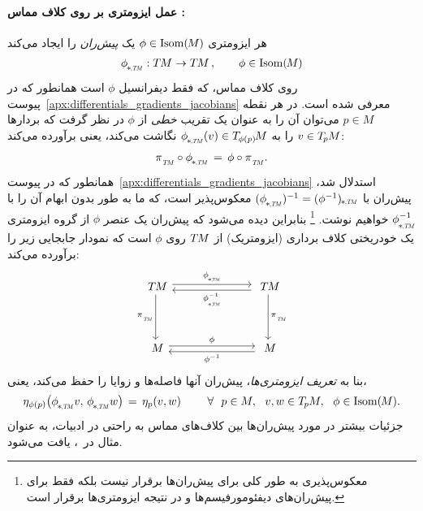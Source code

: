 \paragraph{عمل ایزومتری بر روی کلاف مماس :}

هر ایزومتری $\phi \in \operatorname{Isom}(\mkern-1.5mu M \mkern-.5mu)$ یک \emph{پیش‌ران} را ایجاد می‌کند
\begin{align}
    \dphiTM: \TM \to \TM \,, \qquad \phi\in \IsomM
\end{align}
روی کلاف مماس، که فقط دیفرانسیل $\phi$ است همانطور که در پیوست~\ref{apx:differentials_gradients_jacobians} معرفی شده است.
در هر نقطه $p \in M$ می‌توان آن را به عنوان یک تقریب \emph{خطی} از $\phi$ در نظر گرفت که بردارها $v \in T_{\mkern-1.5mu p}\mkern-.5muM$ را به $\dphiTM(v) \in T_{\mkern-1mu\phi(p)}\mkern-2mu M$ نگاشت می‌کند، یعنی برآورده می‌کند:
\begin{align}\label{eq:pushfwd_bundle_automorphism}
    \piTM \circ \dphiTM \,=\, \phi \circ \piTM.
\end{align}
همانطور که در پیوست~\ref{apx:differentials_gradients_jacobians} استدلال شد، پیش‌ران با $(\dphiTM)^{-1} = (\phi^{-1})_{\mkern-2mu*\mkern-1mu\scalebox{.55}{$,\mkern-2muT\mkern-3muM$}}$ معکوس‌پذیر است، که ما به طور بدون ابهام آن را با $\dphiTMinv$ خواهیم نوشت.%
\footnote{
    معکوس‌پذیری به طور کلی برای پیش‌ران‌ها برقرار نیست بلکه فقط برای پیش‌ران‌های دیفئومورفیسم‌ها و در نتیجه ایزومتری‌ها برقرار است.
}
بنابراین دیده می‌شود که پیش‌ران یک عنصر $\phi$ از گروه ایزومتری یک خودریختی کلاف برداری (ایزومتریک) از $T\mkern-1.5muM$ روی $\phi$ است که نمودار جابجایی زیر را برآورده می‌کند:
\begin{equation}\label{cd:pushforward_TM}
\begin{tikzcd}[column sep=70pt, row sep=40, font=\normalsize]
    \TM
        \arrow[r, shift left=2.5pt, "\dphiTM"]
        \arrow[d, "\piTM"']
    &
    \TM
        \arrow[d, "\piTM"]
        \arrow[l, shift left=2.5pt, "\dphiTMinv"]
    \\
    M
        \arrow[r, shift left=2.5pt, "\phi"]
    &
    M
        \arrow[l, shift left=2.5pt, "\phiinv"]
\end{tikzcd}
\end{equation}
بنا به \emph{تعریف ایزومتری‌ها}، پیش‌ران آنها فاصله‌ها و زوایا را حفظ می‌کند، یعنی،
\begin{align}\label{eq:metric_pushfwd_isometry}
    \eta_{\phi(p)} \big(\dphiTM v,\, \dphiTM w\big) \,=\, \eta_p(v,w)
    \qquad\ \forall\ \ p\in M,\ \  v,w\in \TpM,\ \ \phi \in \IsomM .
\end{align}
جزئیات بیشتر در مورد پیش‌ران‌ها بین کلاف‌های مماس به راحتی در ادبیات، به عنوان مثال در~\cite{schullerGeometricalAnatomy2016}، یافت می‌شود.



